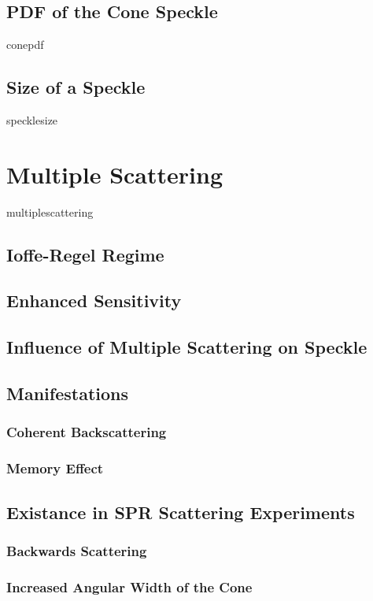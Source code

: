 \documentclass[a4paper,titlepage,onecolumn]{report}
\begin{document}
  \subsection{PDF of the Cone Speckle}
		{conepdf}
		\subsection{Size of a Speckle}
		{specklesize}
		\section{Multiple Scattering} \label{sec:multiplescattering}
 {multiplescattering}
  \subsection{Ioffe-Regel Regime}
  \subsection{Enhanced Sensitivity}
  \subsection{Influence of Multiple Scattering on Speckle}
  \subsection{Manifestations}
   \subsubsection{Coherent Backscattering}
   \subsubsection{Memory Effect}
  \subsection{Existance in SPR Scattering Experiments}
   \subsubsection{Backwards Scattering}
   \subsubsection{Increased Angular Width of the Cone}
\end{document}
